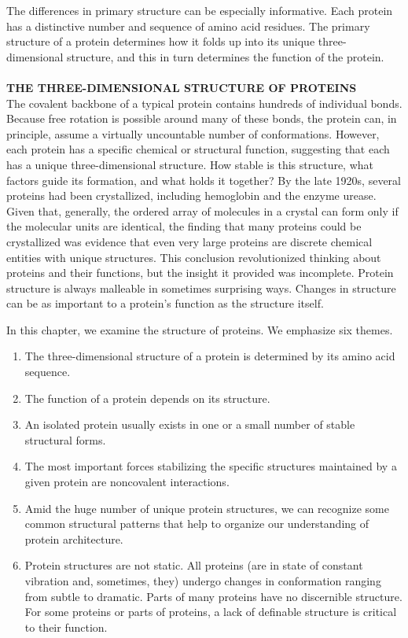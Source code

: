 The differences in primary structure can be especially informative. Each protein has a distinctive number and sequence of amino acid residues. The primary structure of a protein determines how it folds up into its unique three-dimensional structure, and this in turn determines the function of the protein. \\
\\
\textbf{THE THREE-DIMENSIONAL STRUCTURE OF PROTEINS}\\
The covalent backbone of a typical protein contains hundreds of individual bonds. 
Because free rotation is possible around many of these bonds, the protein can, in principle, assume a virtually uncountable number of conformations. 
However, each protein has a specific chemical or structural function, suggesting that each has a unique three-dimensional structure. How stable is this structure, what factors guide its formation, and what holds it together? 
By the late 1920s, several proteins had been crystallized, including hemoglobin and the enzyme urease. Given that, generally, the ordered array of molecules in a crystal can form only if the molecular units are identical, the finding that many proteins could be crystallized was evidence that even very large proteins are discrete chemical entities with unique structures. 
This conclusion revolutionized thinking about proteins and their functions, but the insight it provided was incomplete. Protein structure is always malleable in sometimes surprising ways. Changes in structure can be as important to a protein's function as the structure itself. 

In this chapter, we examine the structure of proteins. We emphasize six themes. 
\begin{enumerate}
\item The three-dimensional structure of a protein is determined by its amino acid sequence. 
\item The function of a protein depends on its structure.
\item An isolated protein usually exists in one or a small number of stable structural forms. 
\item The most important forces stabilizing the specific structures maintained by a given protein are noncovalent interactions. 
\item Amid the huge number of unique protein structures, we can recognize some common structural patterns that help to organize our understanding of protein architecture.
\item Protein structures are not static. All proteins (are in state of constant vibration and, sometimes, they) undergo changes in conformation ranging from subtle to dramatic. Parts of many proteins have no discernible structure. For some proteins or parts of proteins, a lack of definable structure is critical to their function.
\end{enumerate}

